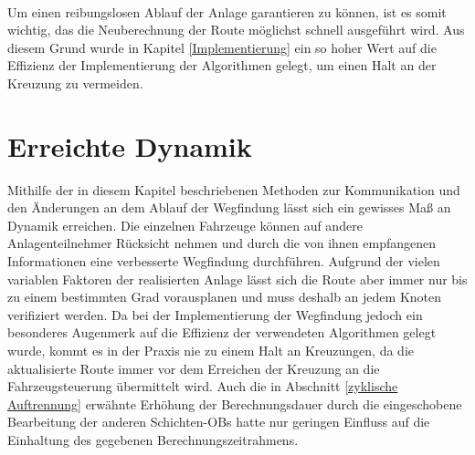 		\\
		Um einen reibungslosen Ablauf der Anlage garantieren zu können, ist es somit wichtig, das die Neuberechnung der Route möglichst schnell ausgeführt wird. Aus diesem Grund wurde in Kapitel \ref{Implementierung} ein so hoher Wert auf die Effizienz der Implementierung der Algorithmen gelegt, um einen Halt an der Kreuzung zu vermeiden.
		
\section{Erreichte Dynamik}
	
	Mithilfe der in diesem Kapitel beschriebenen Methoden zur Kommunikation und den Änderungen an dem Ablauf der Wegfindung lässt sich ein gewisses Maß an Dynamik erreichen. Die einzelnen Fahrzeuge können auf andere Anlagenteilnehmer Rücksicht nehmen und durch die von ihnen empfangenen Informationen eine verbesserte Wegfindung durchführen. Aufgrund der vielen variablen Faktoren der realisierten Anlage lässt sich die Route aber immer nur bis zu einem bestimmten Grad vorausplanen und muss deshalb an jedem Knoten verifiziert werden. Da bei der Implementierung der Wegfindung jedoch ein besonderes Augenmerk auf die Effizienz der verwendeten Algorithmen gelegt wurde, kommt es in der Praxis nie zu einem Halt an Kreuzungen, da die aktualisierte Route immer vor dem Erreichen der Kreuzung an die Fahrzeugsteuerung übermittelt wird. Auch die in Abschnitt \ref{zyklische Auftrennung} erwähnte Erhöhung der Berechnungsdauer durch die eingeschobene Bearbeitung der anderen Schichten-\ac{OB}s hatte nur geringen Einfluss auf die Einhaltung des gegebenen Berechnungszeitrahmens.
